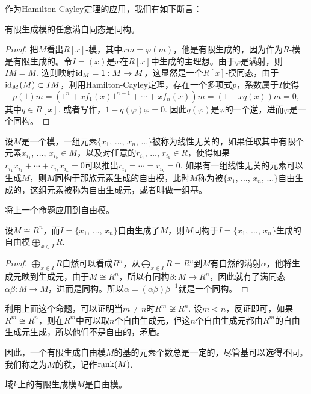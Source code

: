 作为Hamilton-Cayley定理的应用，我们有如下断言：

\begin{pro}
	有限生成模的任意满自同态是同构。
\end{pro}

\begin{proof}
	把$M$看出$R[x]$-模，其中$xm=\varphi(m)$，他是有限生成的，因为作为$R$-模是有限生成的。令$I=(x)$是$x$在$R[x]$中生成的主理想。由于$\varphi$是满射，则$IM=M$. 选则映射$\operatorname{id}_M=1:M\to M$，这显然是一个$R[x]$-模同态，由于$\operatorname{id}_M(M)\subset IM$，利用Hamilton-Cayley定理，存在一个多项式$p$，系数属于$I$使得
	\[
	p(1)m=\left(1^n+xf_1(x)1^{n-1}+\cdots+xf_n(x)\right)m=(1-xq(x))m=0,
	\]
	其中$q\in R[x]$. 或者写作，$1-q(\varphi)\varphi=0$. 因此$q(\varphi)$是$\varphi$的一个逆，进而$\varphi$是一个同构。
\end{proof}

\para 设$M$是一个模，一组元素$\{x_1$, $\dots$, $x_n$, $\dots\}$被称为线性无关的，如果任取其中有限个元素$x_{i_1}$, $\dots$, $x_{i_k}\in M$，以及对任意的$r_{i_1}$, $\dots$, $r_{i_k}\in R$，使得如果$r_{i_1}x_{i_1}+\cdots+r_{i_k}x_{i_k}=0$可以推出$r_{i_1}=\cdots=r_{i_k}=0$. 如果有一组线性无关的元素可以生成$M$，则$M$同构于那族元素生成的自由模，此时$M$称为被$\{x_1$, $\dots$, $x_n$, $\dots\}$自由生成的，这组元素被称为自由生成元，或者叫做一组基。\endpara

将上一个命题应用到自由模。

\begin{pro}
	设$M\cong R^n$，而$I=\{x_1$, $\dots$, $x_n\}$自由生成了$M$，则$M$同构于$I=\{x_1$, $\dots$, $x_n\}$生成的自由模$\bigoplus_{x\in I} R$.
\end{pro}

\begin{proof}
	$\bigoplus_{x\in I} R$自然可以看成$R^n$，从$\bigoplus_{x\in I} R=R^n$到$M$有自然的满射$\alpha$，他将生成元映到生成元，由于$M\cong R^n$，所以有同构$\beta:M\to R^n$，因此就有了满同态$\alpha\beta:M\to M$，进而是同构。所以$\alpha =(\alpha\beta)\beta^{-1}$就是一个同构。
\end{proof}

利用上面这个命题，可以证明当$m\neq n$时$R^m\not\cong R^n$. 设$m<n$，反证即可，如果$R^m\cong R^n$，则在$R^m$中可以取$n$个自由生成元，但这$n$个自由生成元都由$R^m$的自由生成元生成，所以他们不是自由的，矛盾。

因此，一个有限生成自由模$M$的基的元素个数总是一定的，尽管基可以选得不同。我们称之为$M$的秩，记作$\operatorname{rank}(M)$.

\begin{pro}
	域$k$上的有限生成模$M$是自由模。
\end{pro}

